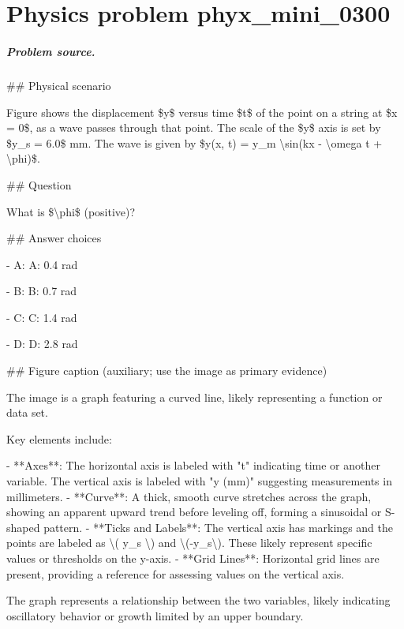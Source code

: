 
\chapter{Physics problem phyx\_mini\_0300}
\label{ch:PhyXMiniProblems_problem_phyx_mini_0300}

\paragraph{Problem source.}
\#\# Physical scenario

Figure shows the displacement \$y\$ versus time \$t\$ of the point on a string at \$x = 0\$, as a wave passes through that point. The scale of the \$y\$ axis is set by \$y\_s = 6.0\$ mm. The wave is given by \$y(x, t) = y\_m \textbackslash{}sin(kx - \textbackslash{}omega t + \textbackslash{}phi)\$.

\#\# Question

What is \$\textbackslash{}phi\$ (positive)?

\#\# Answer choices

- A: A: 0.4 rad

- B: B: 0.7 rad

- C: C: 1.4 rad

- D: D: 2.8 rad

\#\# Figure caption (auxiliary; use the image as primary evidence)

The image is a graph featuring a curved line, likely representing a function or data set. 

Key elements include:

- **Axes**: The horizontal axis is labeled with "t" indicating time or another variable. The vertical axis is labeled with "y (mm)" suggesting measurements in millimeters.
- **Curve**: A thick, smooth curve stretches across the graph, showing an apparent upward trend before leveling off, forming a sinusoidal or S-shaped pattern.
- **Ticks and Labels**: The vertical axis has markings and the points are labeled as \textbackslash{}( y\_s \textbackslash{}) and \textbackslash{}(-y\_s\textbackslash{}). These likely represent specific values or thresholds on the y-axis.
- **Grid Lines**: Horizontal grid lines are present, providing a reference for assessing values on the vertical axis.

The graph represents a relationship between the two variables, likely indicating oscillatory behavior or growth limited by an upper boundary.


